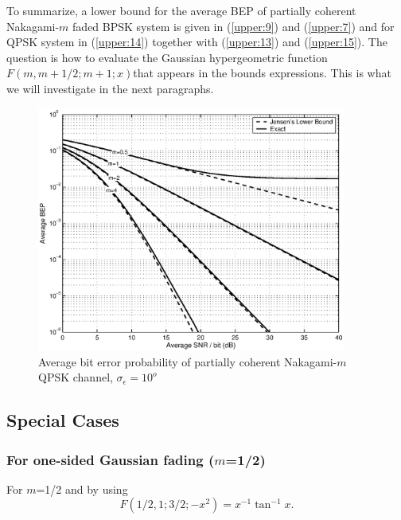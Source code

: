 To summarize, a lower bound for the average BEP of partially
coherent Nakagami-$m$ faded BPSK system is given in
(\ref{upper:9}) and (\ref{upper:7}) and for QPSK system in
(\ref{upper:14}) together with (\ref{upper:13}) and
(\ref{upper:15}). The question is how to evaluate the Gaussian
hypergeometric function $F(m,m+1/2;m+1;x)$that appears in the
bounds expressions. This is what we will investigate in the next
paragraphs.
\begin{figure}[tbp]
\centerline{\includegraphics[width=4in]{./upper001.eps}} 
\caption[]
{Average bit error probability of partially coherent Nakagami-$m$ QPSK channel, $\sigma_\epsilon=10^o$}
\end{figure}
\subsection{Special Cases}
\subsubsection{For one-sided Gaussian fading ($m$=1/2)}
For $m$=1/2 and by using \cite [eq. 15.1.5]{abramowitz:1972}
\begin{equation}
\label{upper:16} F(1/2,1;3/2;-x^2)=x^{-1}\tan ^{-1}x.
\end{equation}
